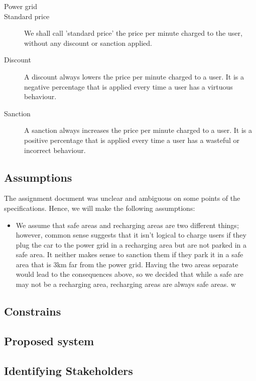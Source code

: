\documentclass{article}
\begin{document}
\begin{description}
				\item[Power grid] %
				
				\item[Standard price] We shall call 'standard price' the price per minute charged to the user, without any discount or sanction applied. 
				
				\item[Discount] A discount always lowers the price per minute charged to a user. It is a negative percentage that is applied every time a user has a virtuous behaviour. 
				\item[Sanction] A sanction always increases the price per minute charged to a user. It is a positive percentage that is applied every time a user has a wasteful or incorrect behaviour. 
				
			\end{description}

		\subsection{Assumptions}
			The assignment document was unclear and ambiguous on some points of the specifications. Hence, we will make the following assumptions:
			
			\begin{itemize}
				\item We assume that safe areas and recharging areas are two different things; however, common sense suggests that it isn't logical to charge users if they plug the car to the power grid in a recharging area but are not parked in a safe area. It neither makes sense to sanction them if they park it in a safe area that is 3km far from the power grid. Having the two areas separate would lead to the consequences above, so we decided that while a safe are may not be a recharging area, recharging areas are always safe areas. w
			\end{itemize}

		\subsection{Constrains}

		\subsection{Proposed system}

		\subsection{Identifying Stakeholders}
\end{document}

